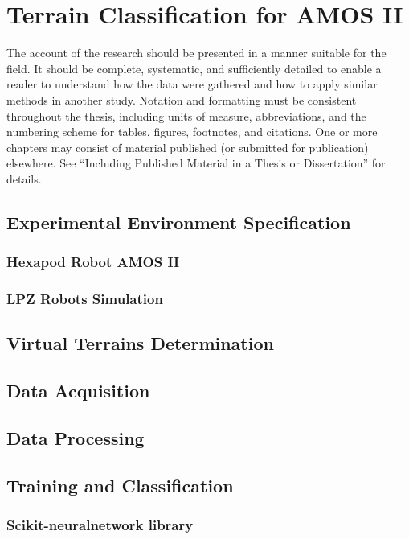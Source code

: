 \chapter{Terrain Classification for AMOS II}
\label{chapter:05:terrain_classification}

The account of the research should be presented in a manner suitable for the field. It should be complete, systematic, and sufficiently detailed to enable a reader to understand how the data were gathered and how to apply similar methods in another study. Notation and formatting must be consistent throughout the thesis, including units of measure, abbreviations, and the numbering scheme for tables, figures, footnotes, and citations. One or more chapters may consist of material published (or submitted for publication) elsewhere. See “Including Published Material in a Thesis or Dissertation” for details.

\section{Experimental Environment Specification}

\subsection{Hexapod Robot AMOS II}

\subsection{LPZ Robots Simulation}

\section{Virtual Terrains Determination}

\section{Data Acquisition}

\section{Data Processing}

\section{Training and Classification}

\subsection{Scikit-neuralnetwork library}